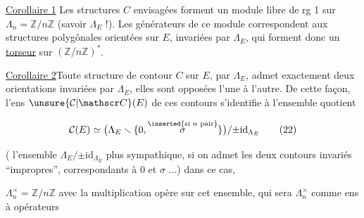 \uline{Corollaire 1} Les structures $C$ envisagées forment
un module libre de rg 1 sur $\Lambda_n=\mathbb Z/n\mathbb Z$
(savoir $\Lambda_E$ !). Les générateurs de ce
module correspondent aux structures
polygônales orientées sur $E$, invariées par $\Lambda_E$,
qui forment donc un \uline{torseur}  sur $(\mathbb Z/n\mathbb Z)^*$.


\uline{Corollaire 2}\quad Toute structure  de contour $C$
sur $E$,  par $\Lambda_E$, admet exactement
deux orientations invariées par $\Lambda_E$, elles sont
opposées l'une à l'autre. De cette façon, l'ens
$\unsure{\mathcal C|\mathscr C}(E)$ de ces contours s'identifie à l'ensemble
quotient

\[
 \mathcal C(E)\simeq\bigl(\Lambda_E\smallsetminus\{0,\overset{\inserted{\text{si }n\text{ pair}}}{\sigma}\}\bigr)/\mathord{\pm}\mathrm{id}_{\Lambda_E} \tag*{(22)}
\]

(  l'ensemble $\Lambda_E/\mathord{\pm}\mathrm{id}_{\Lambda_E}$ plus sympathique,
si on admet les deux contours invariés ``impropres'',
correspondants à $0$ et $\sigma$ $\ldots$) dans ce cas,

  $\Lambda_n^\times=\mathbb Z/n\mathbb Z$ avec la multiplication
opère sur cet ensemble, qui  sera
   $\Lambda_n^\times$ comme ens à opérateurs 

